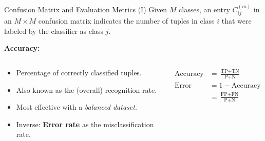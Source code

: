 \begin{frame}{Confusion Matrix and Evaluation Metrics (I)}
	Given $M$ classes, an entry $C^{(m)}_{ij}$ in an $M \times M$ confusion matrix
	indicates the number of tuples in class $i$ that were labeled by the
	classifier as class $j$.
	

	\textbf{Accuracy:}
	\vspace*{-1em}
	\begin{columns}
		\begin{column}{0.55\textwidth}
			\begin{itemize}
				\item Percentage of correctly classified tuples.
				\item Also known as the (overall) recognition rate.
				\item Most effective with a \textit{balanced dataset}.
				\item Inverse: \textbf{Error rate} as the misclassification rate.
			\end{itemize}
		\end{column}
		\begin{column}{0.4\textwidth}
			\vspace*{-1.2em}
			\begin{align*}
				\text{Accuracy}   & = \frac{\text{TP} + \text{TN}}{\text{P} +  \text{N}} \\
				\text{Error Rate} & = 1 - \text{Accuracy}                                \\
				                  & = \frac{\text{FP} + \text{FN}}{\text{P} + \text{N}}
			\end{align*}
		\end{column}
	\end{columns}
\end{frame}

